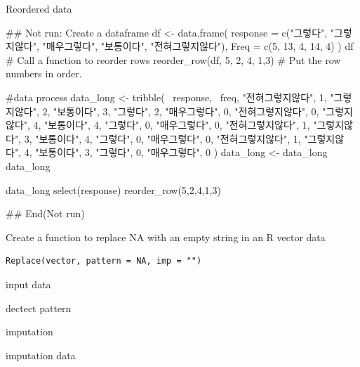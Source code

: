 \documentclass[a4paper]{book}
\begin{document}
%
\begin{Value}
Reordered data
\end{Value}
%
\begin{Examples}
\begin{ExampleCode}
\#\# Not run: 
Create a dataframe
df <- data.frame(
  response = c("그렇다", "그렇지않다", "매우그렇다", "보통이다", "전혀그렇지않다"),
  Freq = c(5, 13, 4, 14, 4)
)
df
# Call a function to reorder rows
reorder_row(df, 5, 2, 4, 1,3)  # Put the row numbers in order.

#data process
data_long <- tribble(
  ~response, ~freq,
  "전혀그렇지않다", 1,
  "그렇지않다", 2,
  "보통이다", 3,
  "그렇다", 2,
  "매우그렇다", 0,
  "전혀그렇지않다", 0,
  "그렇지않다", 4,
  "보통이다", 4,
  "그렇다", 0,
  "매우그렇다", 0,
  "전혀그렇지않다", 1,
  "그렇지않다", 3,
  "보통이다", 4,
  "그렇다", 0,
  "매우그렇다", 0,
  "전혀그렇지않다", 1,
  "그렇지않다", 4,
  "보통이다", 3,
  "그렇다", 0,
  "매우그렇다", 0
)
data_long <- data_long %
data_long

data_long %
  select(response)%
  reorder_row(5,2,4,1,3)


## End(Not run)

\end{ExampleCode}
\end{Examples}
%
\begin{Description}
Create a function to replace NA with an empty string in an R vector data
\end{Description}
%
\begin{Usage}
\begin{verbatim}
Replace(vector, pattern = NA, imp = "")
\end{verbatim}
\end{Usage}
%
\begin{Arguments}
\begin{ldescription}
\item[\code{vector}] input data

\item[\code{pattern}] dectect pattern

\item[\code{imp}] imputation
\end{ldescription}
\end{Arguments}
%
\begin{Value}
imputation data
\end{Value}
\end{document}
